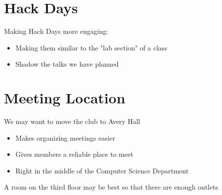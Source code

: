 \section{Hack Days}
Making Hack Days more engaging:
\begin{itemize}
    \item Making them similar to the "lab section" of a class
    \item Shadow the talks we have planned
\end{itemize}

\section{Meeting Location}
We may want to move the club to Avery Hall
\begin{itemize}
    \item Makes organizing meetings easier
    \item Gives members a reliable place to meet
    \item Right in the middle of the Computer Science Department
\end{itemize}
A room on the third floor may be best so that there are enough outlets

